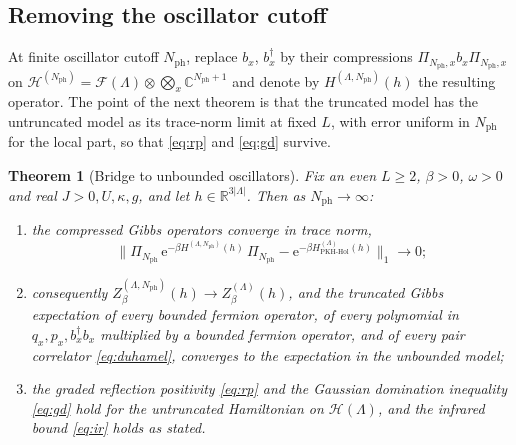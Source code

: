 \documentclass[11pt]{article}
\numberwithin{equation}{section}
\newcommand{\e}{\mathrm{e}}
\newcommand{\R}{\mathbb{R}}
\newcommand{\C}{\mathbb{C}}
\newcommand{\Lamb}{\Lambda}
\newcommand{\PKH}{\mathrm{PKH\text{-}Hol}}
\newcommand{\fN}{N_{\mathrm{ph}}}
\newtheorem{theorem}{Theorem}[section]
\theoremstyle{definition}
\begin{document}
\subsection{Removing the oscillator cutoff}\label{sec:bridge}

At finite oscillator cutoff $\fN$, replace $b_{x}$, $b_{x}^{\dagger}$ by their
compressions $\Pi_{\fN,x}b_{x}\Pi_{\fN,x}$ on
$\mathcal{H}^{(\fN)}=\mathcal{F}(\Lamb)\otimes\bigotimes_{x}\C^{\fN+1}$ and denote by
$H^{(\Lamb,\fN)}(h)$ the resulting operator. The point of the next theorem is that the
truncated model has the untruncated model as its trace-norm limit at fixed $L$, with
error uniform in $\fN$ for the local part, so that \eqref{eq:rp} and \eqref{eq:gd} survive.

\begin{theorem}[Bridge to unbounded oscillators]\label{thm:bridge}
Fix an even $L\ge2$, $\beta>0$, $\omega>0$ and real $J>0,U,\kappa,g$, and let
$h\in\R^{3|\Lamb|}$. Then as $\fN\to\infty$:
\begin{enumerate}
\item the compressed Gibbs operators converge in trace norm,
  \begin{equation}
  \Big\|\Pi_{\fN}\,\e^{-\beta H^{(\Lamb,\fN)}(h)}\,\Pi_{\fN}-\e^{-\beta H^{(\Lamb)}_{\PKH}(h)}\Big\|_{1}\longrightarrow0;
  \label{eq:tracenorm}
  \end{equation}
\item consequently $Z^{(\Lamb,\fN)}_{\beta}(h)\to Z^{(\Lamb)}_{\beta}(h)$, and the
  truncated Gibbs expectation of every bounded fermion operator, of every polynomial in
  $q_{x},p_{x},b_{x}^{\dagger}b_{x}$ multiplied by a bounded fermion operator, and of
  every pair correlator \eqref{eq:duhamel}, converges to the expectation in the unbounded model;
\item the graded reflection positivity \eqref{eq:rp} and the Gaussian domination inequality
  \eqref{eq:gd} hold for the untruncated Hamiltonian on $\mathcal{H}(\Lamb)$, and the infrared
  bound \eqref{eq:ir} holds as stated.
\end{enumerate}
\end{theorem}
\end{document}
